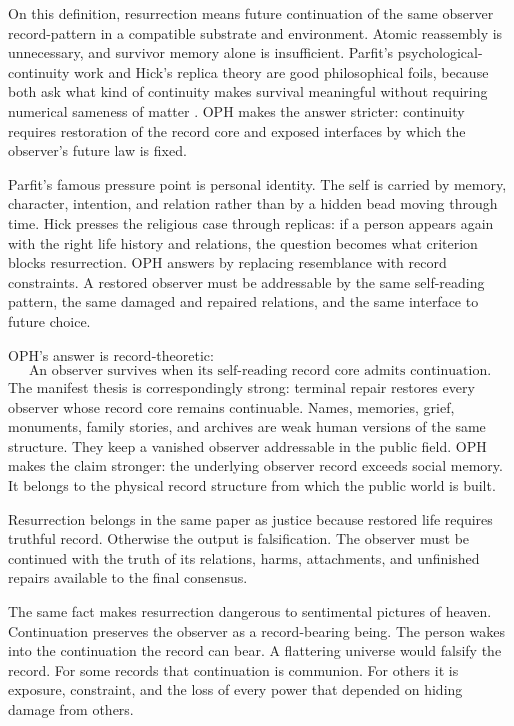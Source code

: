 \documentclass[11pt]{article}
\theoremstyle{remark}
\theoremstyle{plain}
\begin{document}
On this definition, resurrection means future continuation of the same observer
record-pattern in a compatible substrate and environment. Atomic reassembly is
unnecessary, and survivor memory alone is insufficient.
Parfit's psychological-continuity work and Hick's replica theory are good
philosophical foils, because both ask what kind of continuity makes survival
meaningful without requiring numerical sameness of matter
\cite{Parfit1984,Hick1976}. OPH makes the answer stricter: continuity requires
restoration of the record core and exposed interfaces by which the observer's
future law is fixed.

Parfit's famous pressure point is personal identity. The self is carried by
memory, character, intention, and relation rather than by a hidden bead moving
through time. Hick presses the religious case through replicas: if a person
appears again with the right life history and relations, the question becomes
what criterion blocks resurrection. OPH answers by replacing resemblance with
record constraints. A restored observer must be addressable by the same
self-reading pattern, the same damaged and repaired relations, and the same
interface to future choice.

OPH's answer is record-theoretic:
\[
\boxed{
\text{An observer survives when its self-reading record core admits continuation.}
}
\]
The manifest thesis is correspondingly strong: terminal repair restores every
observer whose record core remains continuable.
Names, memories, grief, monuments, family stories, and archives are weak human
versions of the same structure. They keep a vanished observer addressable in
the public field. OPH makes the claim stronger: the underlying observer record
exceeds social memory. It belongs to the physical record structure from which
the public world is built.

Resurrection belongs in the same paper as justice because restored life
requires truthful record. Otherwise the output is falsification. The observer
must be continued with the truth of its relations, harms, attachments, and
unfinished repairs available to the final consensus.

The same fact makes resurrection dangerous to sentimental pictures of heaven.
Continuation preserves the observer as a record-bearing being. The person wakes
into the continuation the record can bear. A flattering universe would falsify
the record. For some records that continuation is
communion. For others it is exposure, constraint, and the loss of every power
that depended on hiding damage from others.
\end{document}
